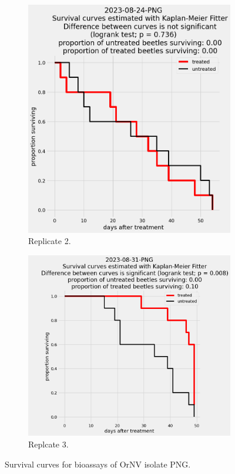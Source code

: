 \documentclass[12pt,letterpaper,english,bibliography=totocnumbered, abstract=on]{scrartcl}
\begin{document}
\begin{figure}[h]
\begin{subfigure}{.3\textwidth}
		\includegraphics[width=\textwidth]{images/survival_curves/2023-08-24-PNG}
		\caption{Replicate 2.}
	\end{subfigure}
	\begin{subfigure}{.3\textwidth}
		\includegraphics[width=\textwidth]{images/survival_curves/2023-08-31-PNG}
		\caption{Replcate 3.}
	\end{subfigure}
	\caption{Survival curves for bioassays of OrNV isolate PNG.}
	\label{fig:PNG survival curves}
\end{figure}
\end{document}
